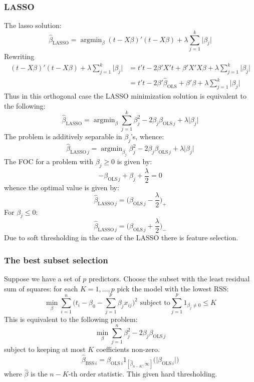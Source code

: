 \documentclass[a4paper]{article}
\newcommand{\argmin}{\mathop{\text{argmin}}}
\begin{document}
\subsubsection*{LASSO} %
\label{ssub:lasso}

The lasso solution:
\[
\hat{\beta}_\text{LASSO}
= \argmin_\beta (t-X\beta)'(t-X\beta) + \lambda \sum_{j=1}^k \lvert \beta_j\rvert
\]
Rewriting
\begin{align*}
	(t-X\beta)'(t-X\beta) + \lambda \sum_{j=1}^k \lvert \beta_j\rvert
	&= t't - 2 \beta'X't + \beta'X'X\beta  + \lambda \sum_{j=1}^k \lvert \beta_j\rvert \\
	&= t't - 2 \beta'\hat{\beta}_\text{OLS} + \beta'\beta  + \lambda \sum_{j=1}^k \lvert \beta_j\rvert
\end{align*}
Thus in this orthogonal case the LASSO minimization solution is equivalent to
the following:
\[
\hat{\beta}_\text{LASSO}
= \argmin_\beta \sum_{j=1}^k \beta_j^2 - 2 \beta_j \beta_{\text{OLS}\,j} + \lambda \lvert \beta_j\rvert
\]
The problem is additively separable in $\beta_j$'s, whence:
\[
\hat{\beta}_{\text{LASSO}\,j}
= \argmin_{\beta_j} \beta_j^2 - 2 \beta_j \beta_{\text{OLS}\,j} + \lambda \lvert \beta_j\rvert
\]
The FOC for a problem with $\beta_j\geq0$ is given by:
\[- \beta_{\text{OLS}\,j} + \beta_j + \frac{\lambda}{2} = 0\]
whence the optimal value is given by:
\[\hat{\beta}_{\text{LASSO}\,j} = \bigl(\beta_{\text{OLS}\,j} - \frac{\lambda}{2}\bigr)_+\]
For $\beta_j\leq 0$:
\[\hat{\beta}_{\text{LASSO}\,j} = \bigl(\beta_{\text{OLS}\,j} + \frac{\lambda}{2}\bigr)_-\]
Due to soft thresholding in the case of the LASSO there is feature selection.


\subsubsection*{The best subset selection} %
\label{ssub:the_best_subset_selection}
Suppose we have a set of $p$ predictors. Choose the subset with the least residual
sum of squares: for each $K = 1,\ldots, p$ pick the model with the lowest RSS:
\[
\min_\beta \sum_{i=1}^n \bigl(t_i - \beta_0 - \sum_{j=1}^p \beta_j x_{ij}\bigr)^2
\text{ subject to} \sum_{j=1}^p 1_{\beta_j \neq 0} \leq K
\]
This is equivalent to the following problem:
\[\min_{\beta} \sum_{j=1}^n \beta_j^2 - 2 \beta_j \beta_{\text{OLS}\,j} \]
subject to keeping at most $K$ coefficients non-zero.
\[
\hat{\beta}_{\text{BSS}\,i}
= \beta_{\text{OLS}\,i} 1_{[\hat{\beta}_{n-K}, \infty]}\bigl(\lvert \beta_{\text{OLS}\,i}\rvert\bigr)\]
where $\hat{\beta}$ is the $n-K$-th order statistic. This given hard thresholding.
\end{document}
